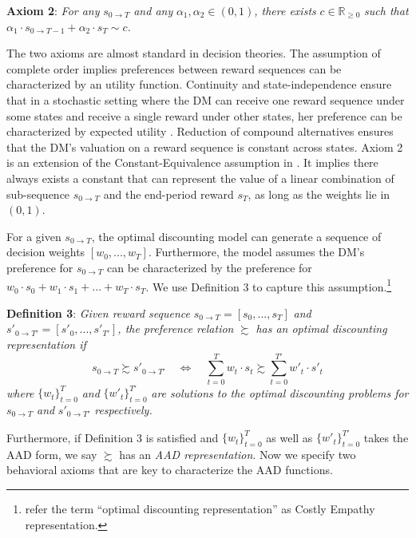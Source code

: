 \documentclass[
  12pt,
]{article}
\begin{document}
\noindent \textbf{Axiom 2}: \emph{For any} \(s_{0\rightarrow T}\)
\emph{and any} \(\alpha_1,\alpha_2 \in (0,1)\)\emph{, there exists}
\(c\in \mathbb{R}_{\geq 0}\) \emph{such that}
\(\alpha_1 \cdot s_{0\rightarrow T-1}+\alpha_2\cdot s_T \sim c\)\emph{.}

The two axioms are almost standard in decision theories. The assumption
of complete order implies preferences between reward sequences can be
characterized by an utility function. Continuity and state-independence
ensure that in a stochastic setting where the DM can receive one reward
sequence under some states and receive a single reward under other
states, her preference can be characterized by expected utility
\citep{herstein1953axiomatic}. Reduction of compound alternatives
ensures that the DM's valuation on a reward sequence is constant across
states. Axiom 2 is an extension of the Constant-Equivalence assumption
in \citet{bleichrodt2008koopmans}. It implies there always exists a
constant that can represent the value of a linear combination of
sub-sequence \(s_{0\rightarrow T}\) and the end-period reward \(s_T\),
as long as the weights lie in \((0,1)\).

For a given \(s_{0\rightarrow T}\), the optimal discounting model can
generate a sequence of decision weights \([w_0,...,w_T]\). Furthermore,
the model assumes the DM's preference for \(s_{0\rightarrow T}\) can be
characterized by the preference for
\(w_0\cdot s_0+w_1\cdot s_1 +...+w_T\cdot s_T\). We use Definition 3 to
capture this assumption.\footnote{\citet{noor2022optimal} refer the term
  ``optimal discounting representation'' as Costly Empathy
  representation.}

\noindent \textbf{Definition 3}: \emph{Given reward sequence}
\(s_{0\rightarrow T}=[s_0,...,s_T]\) \emph{and}
\(s'_{0\rightarrow T'}=[s'_0,...,s'_{T'}]\)\emph{, the preference
relation} \(\succsim\) \emph{has an optimal discounting representation
if} \[
s_{0\rightarrow T} \succsim s'_{0\rightarrow T'}\quad
\Longleftrightarrow \quad \sum_{t=0}^T w_t\cdot s_t
\succsim \sum_{t=0}^{T'} w'_t \cdot s'_t
\] \emph{where} \(\{w_t\}_{t=0}^T\) \emph{and} \(\{w'_t\}^{T'}_{t=0}\)
\emph{are solutions to the optimal discounting problems for}
\(s_{0\rightarrow T}\) \emph{and} \(s'_{0\rightarrow T'}\)
\emph{respectively.}

Furthermore, if Definition 3 is satisfied and \(\{w_t\}_{t=0}^T\) as
well as \(\{w'_t\}^{T'}_{t=0}\) takes the AAD form, we say \(\succsim\)
has an \emph{AAD representation}. Now we specify two behavioral axioms
that are key to characterize the AAD functions.
\end{document}
